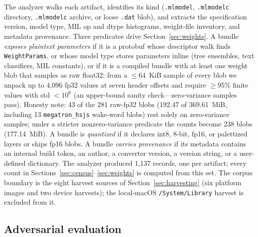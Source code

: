 \documentclass[letterpaper,twocolumn,10pt]{article}
\newcommand{\mlmodel}{\texttt{.mlmodel}\xspace}
\newcommand{\mlmodelc}{\texttt{.mlmodelc}\xspace}
\begin{document}
The analyzer walks each artifact, identifies its kind
(\mlmodel{}, \mlmodelc{} directory, \mlmodelc{} archive, or loose \texttt{.dat}
blob), and extracts the specification version, model type, MIL op and dtype
histograms, weight-file inventory, and metadata provenance.
Three predicates drive Section~\ref{sec:weights}.
A bundle \emph{exposes plaintext parameters} if it is a protobuf whose
descriptor walk finds \texttt{WeightParams}, or whose model type stores
parameters inline (tree ensembles, text classifiers, MIL constants), or if
it is a compiled bundle with at least one weight blob that samples as raw
float32: from a $\le$64~KiB sample of every blob we unpack up to 4{,}096
fp32 values at seven header offsets and require $\ge$95\% finite values
with std $<10^6$ (an upper-bound sanity check---zero-variance samples
pass). Honesty note: 43 of the 281 raw-fp32 blobs (192.47 of
369.61~MiB, including 13 \texttt{megatron\_hsjs} wake-word blobs) rest
solely on zero-variance samples; under a stricter nonzero-variance
predicate the counts become 238 blobs (177.14~MiB).
A bundle is \emph{quantized} if it declares int8, 8-bit, fp16, or palettized
layers or ships fp16 blobs.
A bundle \emph{carries provenance} if its metadata contains an internal
build token, an author, a converter version, a version string, or a
user-defined dictionary.
The analyzer produced 1{,}137 records, one per artifact; every count in
Sections~\ref{sec:census}--\ref{sec:weights} is computed from this set.
The corpus boundary is the eight harvest sources of
Section~\ref{sec:harvesting} (six platform images and two device
harvests); the local-macOS \texttt{/System/Library} harvest is excluded
from it.

\subsection{Adversarial evaluation}
\end{document}
